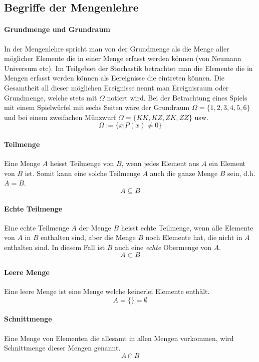 \subsection{Begriffe der Mengenlehre}
\paragraph{Grundmenge und Grundraum}
In der Mengenlehre spricht man von der Grundmenge als die Menge aller
möglicher Elemente die in einer Menge erfasst werden können (von Neumann
Universum etc). Im Teilgebiet der Stochastik betrachtet man die
Elemente die in Mengen erfasst werden können als Eereignisse die eintreten
können. Die Gesamtheit all dieser möglichen Ereignisse nennt man 
\gls{Ereignisraum} oder Grundmenge, welche stets mit $\Omega$ 
notiert wird. 
Bei der Betrachtung eines Spiels mit einem Spielwürfel mit sechs Seiten 
wäre der Grundraum $\Omega=\{1,2,3,4,5,6\}$ und bei einem zweifachen
Münzwurf $\Omega=\{KK, KZ, ZK, ZZ\}$ usw.
\[  
	\Omega := \{x| P(x) \neq 0\}
\]

\paragraph{Teilmenge} 
Eine Menge $A$ heisst \gls{Teilmenge} von $B$, wenn jedes Element aus 
$A$ ein Element von $B$ ist. Somit kann eine solche Teilmenge $A$
auch die ganze Menge $B$ sein, d.h. $A=B$.
\[ 
	A \subseteq B
\]
\paragraph{Echte Teilmenge}
Eine \gls{echte Teilmenge} $A$ der Menge $B$ heisst echte Teilmenge, wenn
alle Elemente von $A$ in $B$ enthalten sind, aber die Menge $B$ noch
Elemente hat, die nicht in $A$ enthalten sind. In diesem Fall ist $B$ 
auch eine \emph{echte} Obermenge von $A$.
\[
	A \subset B
\]

\paragraph{Leere Menge} Eine \gls{leere Menge} ist eine Menge welche 
keinerlei Elemente enthält.
\[  
	A = \{\} = \emptyset
\]

\paragraph{Schnittmenge} Eine Menge von Elementen die allesamt in
allen Mengen vorkommen, wird \gls{Schnittmenge} dieser Mengen genannt.
\[ 
	A \cap B
\]


